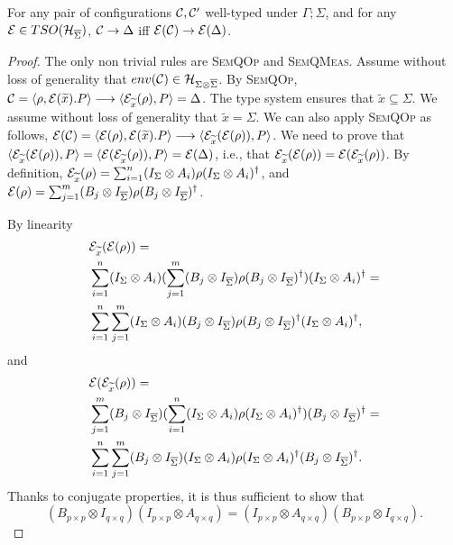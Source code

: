 \begin{lemma}\label{lemma:sop}
	For any pair of configurations $\mathcal{C}, \mathcal{C}'$ well-typed under $\Gamma; \Sigma$, and for any $\mathcal{E} \in TSO(\mathcal{H}_{\overline{\Sigma}})$,
	$\mathcal{C} \rightarrow \Delta$ iff $\mathcal{E}(\mathcal{C}) \rightarrow \mathcal{E}(\Delta)$.
\end{lemma}
\begin{proof}
	The only non trivial rules are {\scshape SemQOp} and {\scshape SemQMeas}.
	Assume without loss of generality that $env(\mathcal{C}) \in \mathcal{H}_{\Sigma \otimes \overline{\Sigma}}$.
	By {\scshape SemQOp}, $\mathcal{C} = \langle \rho, \mathcal{E}(\widetilde{x}) . P \rangle \longrightarrow \langle \mathcal{E}_{\widetilde{x}}(\rho), P \rangle = \Delta$.
	The type system ensures that $\tilde{x} \subseteq \Sigma$.
	We assume without loss of generality that $\tilde{x} = \Sigma$.
	We can also apply {\scshape SemQOp} as follows, $\mathcal{E}(\mathcal{C}) = \langle \mathcal{E}(\rho), \mathcal{E}(\widetilde{x}) . P \rangle  \longrightarrow \langle \mathcal{E}_{\widetilde{x}}(\mathcal{E}(\rho)), P \rangle$.
	We need to prove that $\langle \mathcal{E}_{\widetilde{x}}(\mathcal{E}(\rho)), P \rangle = \langle \mathcal{E}(\mathcal{E}_{\widetilde{x}}(\rho)), P \rangle = \mathcal{E}(\Delta)$, i.e., that $\mathcal{E}_{\widetilde{x}}(\mathcal{E}(\rho)) = \mathcal{E}(\mathcal{E}_{\widetilde{x}}(\rho))$.
	By definition, $\mathcal{E}_{\widetilde{x}}(\rho) = \sum_{i = 1}^{n} (I_{\Sigma} \otimes A_i) \rho (I_{\Sigma} \otimes A_i)^{\dagger}$, and $\mathcal{E}(\rho) = \sum_{j = 1}^{m} (B_j \otimes I_{\overline{\Sigma}}) \rho (B_j \otimes I_{\overline{\Sigma}})^{\dagger}$.

	By linearity 
	\begin{align*}
	&\mathcal{E}_{\widetilde{x}}(\mathcal{E}(\rho)) =\\ 
	&\sum_{i = 1}^{n} (I_{\Sigma} \otimes A_i) (\sum_{j = 1}^{m} (B_j \otimes I_{\overline{\Sigma}}) \rho (B_j \otimes I_{\overline{\Sigma}})^{\dagger}) (I_{\Sigma} \otimes A_i)^{\dagger} =\\
	&\sum_{i = 1}^{n} \sum_{j = 1}^{m} (I_{\Sigma} \otimes A_i) (B_j \otimes I_{\overline{\Sigma}}) \rho (B_j \otimes I_{\overline{\Sigma}})^{\dagger} (I_{\Sigma} \otimes A_i)^{\dagger},
	\end{align*}
	and
	\begin{align*}
	&\mathcal{E}(\mathcal{E}_{\widetilde{x}}(\rho)) =\\
	&\sum_{j = 1}^{m} (B_j \otimes I_{\overline{\Sigma}}) (\sum_{i = 1}^{n} (I_{\Sigma} \otimes A_i) \rho (I_{\Sigma} \otimes A_i)^{\dagger}) (B_j \otimes I_{\overline{\Sigma}})^{\dagger} =\\
	&\sum_{i = 1}^{n} \sum_{j = 1}^{m} (B_j \otimes I_{\overline{\Sigma}}) (I_{\Sigma} \otimes A_i) \rho (I_{\Sigma} \otimes A_i)^{\dagger} (B_j \otimes I_{\overline{\Sigma}})^{\dagger}.
	\end{align*}
	Thanks to conjugate properties, it is thus sufficient to show that
	\[
	(B_{p\times p} \otimes I_{q\times q}) (I_{p\times p} \otimes A_{q\times q}) = (I_{p\times p} \otimes A_{q\times q}) (B_{p\times p} \otimes I_{q\times q}).
	\]
	

\end{proof}
